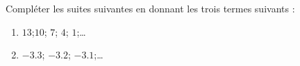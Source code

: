 
\begin{exercice}\label{exo2smath-0083}

    Compléter les suites suivantes en donnant les trois termes suivants :
    \begin{enumerate}
        \item
            \( 13\);\(10 \); \( 7\); \( 4\); \( 1\);\ldots
        \item
            \( -3.3\); \( -3.2\); \( -3.1\);\ldots
    \end{enumerate}

\end{exercice}
